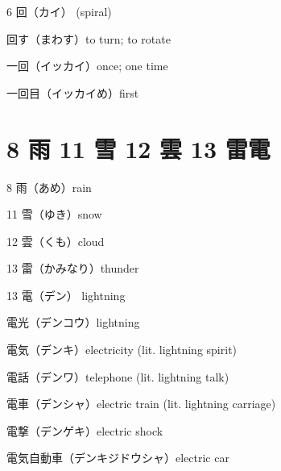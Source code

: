 6 回（カイ） (spiral)

回す（まわす）to turn; to rotate

一回（イッカイ）once; one time

一回目（イッカイめ）first

\section{8 雨 11 雪 12 雲 13 雷電}

8 雨（あめ）rain

11 雪（ゆき）snow

12 雲（くも）cloud

13 雷（かみなり）thunder

13 電（デン） lightning

電光（デンコウ）lightning

電気（デンキ）electricity (lit. lightning spirit)

電話（デンワ）telephone (lit. lightning talk)

電車（デンシャ）electric train (lit. lightning carriage)

電撃（デンゲキ）electric shock

電気自動車（デンキジドウシャ）electric car
